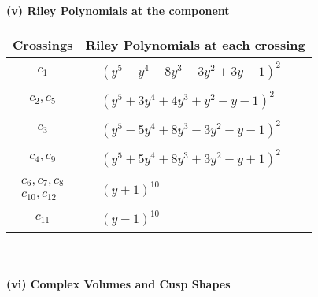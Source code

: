 \documentclass[1p]{elsarticle_modified}
\theoremstyle{definition}
\begin{document}
\newpage\renewcommand{\arraystretch}{1}
\flushleft \textbf{(v) Riley Polynomials at the component}\newline \\
\begin{tabular}{m{50pt}|m{274pt}}
Crossings & \hspace{64pt}Riley Polynomials at each crossing \\
\hline $$\begin{aligned}c_{1}\end{aligned}$$&$\begin{aligned}
&(y^5- y^4+8 y^3-3 y^2+3 y-1)^2
\end{aligned}$\\
\hline $$\begin{aligned}c_{2},c_{5}\end{aligned}$$&$\begin{aligned}
&(y^5+3 y^4+4 y^3+y^2- y-1)^2
\end{aligned}$\\
\hline $$\begin{aligned}c_{3}\end{aligned}$$&$\begin{aligned}
&(y^5-5 y^4+8 y^3-3 y^2- y-1)^2
\end{aligned}$\\
\hline $$\begin{aligned}c_{4},c_{9}\end{aligned}$$&$\begin{aligned}
&(y^5+5 y^4+8 y^3+3 y^2- y+1)^2
\end{aligned}$\\
\hline $$\begin{aligned}c_{6},c_{7},c_{8}\\c_{10},c_{12}\end{aligned}$$&$\begin{aligned}
&(y+1)^{10}
\end{aligned}$\\
\hline $$\begin{aligned}c_{11}\end{aligned}$$&$\begin{aligned}
&(y-1)^{10}
\end{aligned}$\\
\hline
\end{tabular}\\~\\
\newpage\flushleft \textbf{(vi) Complex Volumes and Cusp Shapes}
\end{document}
